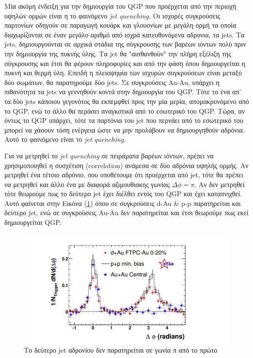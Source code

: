 	Μία ακόμη ένδειξη για την δημιουργία του QGP που προέρχεται από την περιοχή υψηλών ορμών είναι η το φαινόμενο \textit{jet quenching}. 
	Οι ισχυρές συγκρούσεις παρτονίων οδηγούν σε παραγωγή κουάρκ και γλουονίων με μεγάλη ορμή τα οποία διαχωρίζονται σε έναν μεγάλο αριθμό από ισχρά κατευθυνόμενα αδρονια, τα jets. 
	Τα jets, δημιουργούνται σε αρχικά στάδια της σύγκρουσης των βαρέων ιόντων πολύ πριν την δημιουργία της πυκνής ύλης. Τα jet θα "αισθανθούν" την πλήρη εξέλιξη της σύγκρουσης και έτσι θα φέρουν πληροφορίες και από την φάση όπου δημιουργείται η πυκνή και θερμή ύλη. Επειδή η πλειοψηφία των ισχυρών συγκρούσεων είναι μεταξύ δύο σωμάτων, θα παρατηρούμε δύο jets. Σε συγκρούσεις Au-Au,  υπάρχει η πιθανότητα τα jets να γεννηθούν κοντά στην δημιουργία του QGP. Τότε το ένα απ' τα δύο jets κάποιου γεγονότος θα εκπεμφθεί προς την μία μερία, απομακρυνόμενο από το QGP, ενώ το άλλο θα περάσει αναγκστικά από το εσωτερικό του QGP.
	Τώρα, αν όντως το QGP υπάρχει, τότε τα παρτόνια του jet που περνάει από το εσωτερικό του μπορεί να χάσουν τόση ενέργεια ώστε να μην προλάβουν να δημιουργηθούν αδρόνια. Αυτό το φαινόμενο είναι το \textit{jet quenching}.
	
	Για να μετρηθεί το \textit{jet quenching} σε πειράματα βαρέων ιόντων, πρέπει να χρησιμοποιηθεί η συσχέτιση (correlation) ανάμεσα σε δύο αδρόνια υψηλής ορμής.
	Αν μετρηθεί ένα τέτοιο αδρόνιο, που υποθέτουμε ότι προέρχεται από jet, τότε θα πρέπει να μετρηθεί και άλλο ένα με διαφορά αζιμουθιακης γωνίας $\Delta\phi=\pi$. Αν δεν μετρηθεί τότε θεωρούμε πως το δεύτερο jet έχει διέλθει εντός του QGP και έχει καταπνιχθεί. 
	Αυτό φαίνεται στην Εικόνα (\ref{fig4.12}) όπου σε συγκρούσεις d-Au \& p-p  παρατηρείται και δεύτερο jet, ενώ σε συγκρούσεις Au-Au δεν παρατηρείται και έτσι θεωρούμε πως εκεί δημιουργείται QGP.
	
	\begin{figure}[h!]
		\centering
		\includegraphics[scale=0.9]{STAR_Results/jet_quenching}
		\caption{Το δεύτερο jet αδρονίου δεν παρατηρείται σε γωνία π από το πρώτο}
		\label{fig4.12}
	\end{figure}
	
